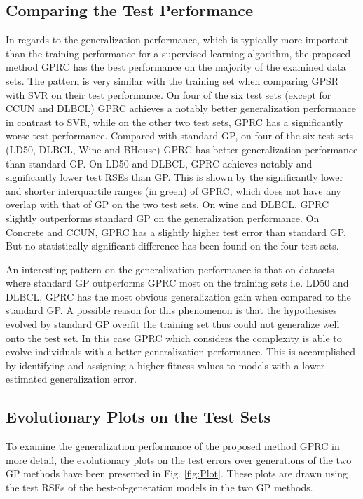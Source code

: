 \documentclass[conference]{IEEEtran}
\begin{document}
\subsection{Comparing the Test Performance}
In regards to the generalization performance, which is typically more important than the training performance for a supervised learning algorithm, the proposed method GPRC has the best performance on the majority of the examined data sets. The pattern is very similar with the training set when comparing GPSR with SVR on their test performance. On four of the six test sets (except for CCUN and DLBCL) GPRC achieves a notably better generalization performance in contrast to SVR, while on the other two test sets, GPRC has a significantly worse test performance. Compared with standard GP, on four of the six test sets (LD50, DLBCL, Wine and BHouse) GPRC has better generalization performance than standard GP. On LD50 and DLBCL, GPRC achieves notably and significantly lower test RSEs than GP. This is shown by the significantly lower and shorter interquartile ranges (in green) of GPRC, which does not have any overlap with that of GP on the two test sets. On wine and DLBCL, GPRC slightly outperforms standard GP on the generalization performance. On Concrete and CCUN, GPRC has a slightly higher test error than standard GP. But no statistically significant difference has been found on the four test sets. 

An interesting pattern on the generalization performance is that on datasets where standard GP outperforms GPRC most on the training sets i.e. LD50 and DLBCL, GPRC has the most obvious generalization gain when compared to the standard GP. A possible reason for this phenomenon is that the hypothesises evolved by standard GP overfit the training set thus could not generalize well onto the test set. In this case GPRC which considers the complexity is able to evolve individuals with a better generalization performance. This is accomplished by identifying and assigning a higher fitness values to models with a lower estimated generalization error. 

\subsection{Evolutionary Plots on the Test Sets}
To examine the generalization performance of the proposed method GPRC in more detail, the evolutionary plots on the test errors over generations of the two GP methods have been presented in Fig. \ref{fig:Plot}. These plots are drawn using the test RSEs of the best-of-generation models in the two GP methods.
\end{document}
